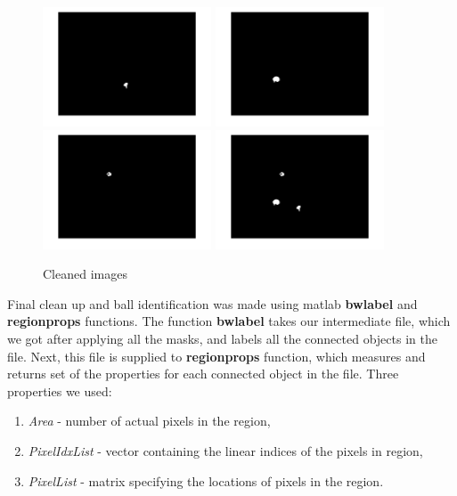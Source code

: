 \documentclass[10pt,a4paper,oneclumn]{article}
\begin{document}
\begin{figure}[h!]
\centering
  \includegraphics[width=5cm]{cleanedYell.jpg}
  \includegraphics[width=5cm]{cleanGreen.jpg}
  \includegraphics[width=5cm]{cleanRed.jpg}
  \includegraphics[width=5cm]{cleanAll.jpg}
\caption{Cleaned images}
\end{figure}

Final clean up and ball identification was made using matlab \textbf{bwlabel} and \textbf{regionprops} functions. The function \textbf{bwlabel} takes our intermediate file, which we got after applying all the masks, and labels all the connected objects in the file. Next, this file is supplied to \textbf{regionprops} function, which measures and returns set of the properties for each connected object in the file. Three properties we used:

\begin{enumerate}
\item \emph{Area} - number of actual pixels in the region,
\item \emph{PixelIdxList} - vector containing the linear indices of the pixels in region,
\item \emph{PixelList} - matrix specifying the locations of pixels in the region.
\end{enumerate}
\end{document}
